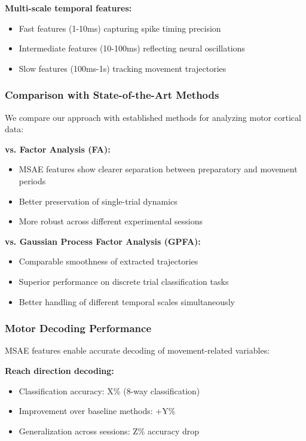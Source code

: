 \textbf{Multi-scale temporal features:}
\begin{itemize}
\item Fast features (1-10ms) capturing spike timing precision
\item Intermediate features (10-100ms) reflecting neural oscillations
\item Slow features (100ms-1s) tracking movement trajectories
\end{itemize}

\subsubsection{Comparison with State-of-the-Art Methods}

We compare our approach with established methods for analyzing motor cortical data:

\textbf{vs. Factor Analysis (FA):}
\begin{itemize}
\item MSAE features show clearer separation between preparatory and movement periods
\item Better preservation of single-trial dynamics
\item More robust across different experimental sessions
\end{itemize}

\textbf{vs. Gaussian Process Factor Analysis (GPFA):}
\begin{itemize}
\item Comparable smoothness of extracted trajectories
\item Superior performance on discrete trial classification tasks
\item Better handling of different temporal scales simultaneously
\end{itemize}

\subsubsection{Motor Decoding Performance}

MSAE features enable accurate decoding of movement-related variables:

\textbf{Reach direction decoding:}
\begin{itemize}
\item Classification accuracy: X\% (8-way classification)
\item Improvement over baseline methods: +Y\%
\item Generalization across sessions: Z\% accuracy drop
\end{itemize}

